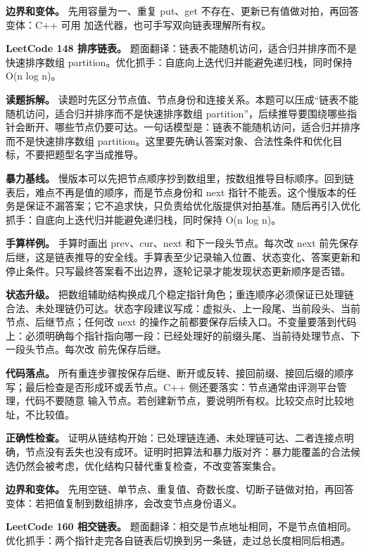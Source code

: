 \textbf{边界和变体。} 先用容量为一、重复 put、get 不存在、更新已有值做对拍，再回答变体：C++ 可用  加迭代器，也可手写双向链表理解所有权。

\noindent\textbf{LeetCode 148 排序链表。} 题面翻译：链表不能随机访问，适合归并排序而不是快速排序数组 partition。优化抓手：自底向上迭代归并能避免递归栈，同时保持 O(n log n)。

\textbf{读题拆解。} 读题时先区分节点值、节点身份和连接关系。本题可以压成“链表不能随机访问，适合归并排序而不是快速排序数组 partition”，后续推导要围绕哪些指针会断开、哪些节点仍要可达。一句话模型是：链表不能随机访问，适合归并排序而不是快速排序数组 partition。这里要先确认答案对象、合法性条件和优化目标，不要把题型名字当成推导。

\textbf{暴力基线。} 慢版本可以先把节点顺序抄到数组里，按数组推导目标顺序。回到链表后，难点不再是值的顺序，而是节点身份和 next 指针不能丢。这个慢版本的任务是保证不漏答案；它不追求快，只负责给优化版提供对拍基准。随后再引入优化抓手：自底向上迭代归并能避免递归栈，同时保持 O(n log n)。

\textbf{手算样例。} 手算时画出 prev、cur、next 和下一段头节点。每次改 next 前先保存后继，这是链表推导的安全线。手算表至少记录输入位置、状态变化、答案更新和停止条件。只写最终答案看不出边界，逐轮记录才能发现状态更新顺序是否错。

\textbf{状态升级。} 把数组辅助结构换成几个稳定指针角色；重连顺序必须保证已处理链合法、未处理链仍可达。状态字段建议写成：虚拟头、上一段尾、当前段头、当前节点、后继节点；任何改 next 的操作之前都要保存后续入口。不变量要落到代码上：必须明确每个指针指向哪一段：已经处理好的前缀头尾、当前待处理节点、下一段头节点。每次改  前先保存后继。

\textbf{代码落点。} 所有重连步骤按保存后继、断开或反转、接回前缀、接回后缀的顺序写；最后检查是否形成环或丢节点。C++ 侧还要落实：节点通常由评测平台管理，代码不要随意  输入节点。若创建新节点，要说明所有权。比较交点时比较地址，不比较值。

\textbf{正确性检查。} 证明从链结构开始：已处理链连通、未处理链可达、二者连接点明确，节点没有丢失也没有成环。证明时把算法和暴力版对齐：暴力能覆盖的合法候选仍然会被考虑，优化结构只替代重复检查，不改变答案集合。

\textbf{边界和变体。} 先用空链、单节点、重复值、奇数长度、切断子链做对拍，再回答变体：若把值复制到数组排序，会改变节点身份语义。

\noindent\textbf{LeetCode 160 相交链表。} 题面翻译：相交是节点地址相同，不是节点值相同。优化抓手：两个指针走完各自链表后切换到另一条链，走过总长度相同后相遇。

